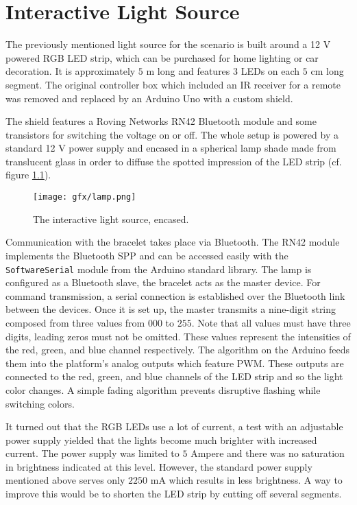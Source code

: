 \chapter{Interactive Light Source}
\label{sec:lamp}

The previously mentioned light source for the scenario is built around a 12 V powered RGB \ac{LED} strip, which can be purchased for home lighting or car decoration. It is approximately $5$ m long and features 3 \ac{LED}s on each $5$ cm long segment. The original controller box which included an \ac{IR} receiver for a remote was removed and replaced by an Arduino Uno \cite{arduino_uno} with a custom shield. 

The shield features a Roving Networks RN42 Bluetooth module \cite{datasheet_rn42} and some transistors for switching the voltage on or off. The whole setup is powered by a standard 12 V power supply and encased in a spherical lamp shade made from translucent glass in order to diffuse the spotted impression of the LED strip (cf. figure \ref{fig:lamp}).

\begin{figure}[bth]
	\begin{center}
		\texttt{[image: gfx/lamp.png]}
	\end{center}
	\caption{The interactive light source, encased.} \label{fig:lamp}
\end{figure} 

Communication with the bracelet takes place via Bluetooth. The RN42 module implements the Bluetooth \ac{SPP} and can be accessed easily with the \texttt{SoftwareSerial} module from the Arduino standard library. The lamp is configured as a Bluetooth slave, the bracelet acts as the master device. For command transmission, a serial connection is established over the Bluetooth link between the devices. Once it is set up, the master transmits a nine-digit string composed from three values from $000$ to $255$. Note that all values must have three digits, leading zeros must not be omitted. These values represent the intensities of the red, green, and blue channel respectively. The algorithm on the Arduino feeds them into the platform's analog outputs which feature \ac{PWM}. These outputs are connected to the red, green, and blue channels of the \ac{LED} strip and so the light color changes. A simple fading algorithm prevents disruptive flashing while switching colors.

It turned out that the RGB \ac{LED}s use a lot of current, a test with an adjustable power supply yielded that the lights become much brighter with increased current. The power supply was limited to $5$ Ampere and there was no saturation in brightness indicated at this level. However, the standard power supply mentioned above serves only $2250$ mA which results in less brightness. A way to improve this would be to shorten the \ac{LED} strip by cutting off several segments.